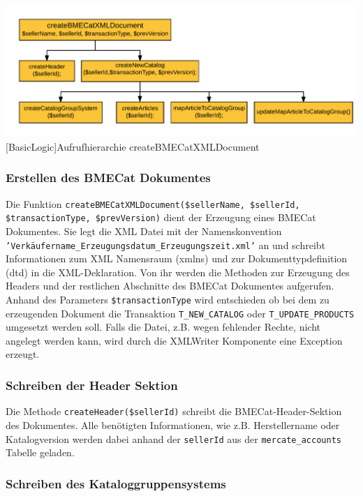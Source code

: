 	\begin{minipage}{\linewidth}
		\vspace{1em}
		\centering
		\includegraphics[width=0.7 \linewidth]{img/createBMECatHierarchie}
		[BasicLogic]{Aufrufhierarchie createBMECatXMLDocument}
		\vspace{1em}
	\end{minipage}
	
	
	
	
	
	\subsubsection{Erstellen des BMECat Dokumentes}
	
	Die Funktion \texttt{createBMECatXMLDocument(\$sellerName, \$sellerId, \$transactionType, \$prevVersion)} dient der Erzeugung eines BMECat Dokumentes. Sie legt die XML Datei mit der Namenskonvention \texttt{'Verkäufername\_Erzeugungsdatum\_Erzeugungszeit.xml'} an und schreibt Informationen zum XML Namensraum (xmlns) und zur Dokumenttypdefinition (dtd) in die XML-Deklaration. Von ihr werden die Methoden zur Erzeugung des Headers und der restlichen Abschnitte des BMECat Dokumentes aufgerufen.
	Anhand des Parameters \texttt{\$transactionType} wird entschieden ob bei dem zu erzeugenden Dokument die Transaktion \texttt{T\_NEW\_CATALOG} oder \texttt{T\_UPDATE\_PRODUCTS} umgesetzt werden soll. Falls die Datei, z.B. wegen fehlender Rechte, nicht angelegt werden kann, wird durch die XMLWriter Komponente eine Exception erzeugt.
	
	\subsubsection{Schreiben der Header Sektion}

	Die Methode \texttt{createHeader(\$sellerId)} schreibt die BMECat-Header-Sektion des Dokumentes. Alle benötigten Informationen, wie z.B. Herstellername oder Katalogversion werden dabei anhand der \texttt{sellerId} aus der \texttt{mercate\_accounts} Tabelle geladen.
	
	\subsubsection{Schreiben des Kataloggruppensystems}
	
